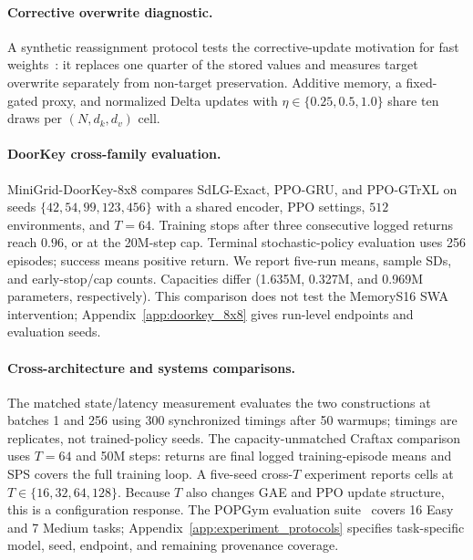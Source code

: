 \paragraph{Corrective overwrite diagnostic.}
A synthetic reassignment protocol tests the corrective-update motivation for fast weights~\cite{schlag2021linear}: it replaces one quarter of the stored values and measures target overwrite separately from non-target preservation. Additive memory, a fixed-gated proxy, and normalized Delta updates with $\eta\in\{0.25,0.5,1.0\}$ share ten draws per $(N,d_k,d_v)$ cell.

\paragraph{DoorKey cross-family evaluation.}
MiniGrid-DoorKey-8x8 compares SdLG-Exact, PPO-GRU, and PPO-GTrXL on seeds $\{42,54,99,123,456\}$ with a shared encoder, PPO settings, $512$ environments, and $T=64$. Training stops after three consecutive logged returns reach $0.96$, or at the 20M-step cap. Terminal stochastic-policy evaluation uses 256 episodes; success means positive return. We report five-run means, sample SDs, and early-stop/cap counts. Capacities differ (1.635M, 0.327M, and 0.969M parameters, respectively). This comparison does not test the MemoryS16 SWA intervention; Appendix~\ref{app:doorkey_8x8} gives run-level endpoints and evaluation seeds.

\paragraph{Cross-architecture and systems comparisons.}
The matched state/latency measurement evaluates the two constructions at batches 1 and 256 using 300 synchronized timings after 50 warmups; timings are replicates, not trained-policy seeds. The capacity-unmatched Craftax comparison uses $T=64$ and 50M steps: returns are final logged training-episode means and SPS covers the full training loop. A five-seed cross-$T$ experiment reports cells at $T\in\{16,32,64,128\}$. Because $T$ also changes GAE and PPO update structure, this is a configuration response. The POPGym evaluation suite~\cite{morad2023popgym} covers 16 Easy and 7 Medium tasks; Appendix~\ref{app:experiment_protocols} specifies task-specific model, seed, endpoint, and remaining provenance coverage.
